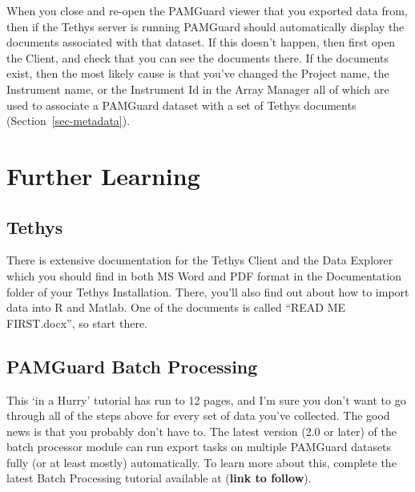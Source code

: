 \documentclass[
]{article}
\begin{document}
When you close and re-open the PAMGuard viewer that you exported data
from, then if the Tethys server is running PAMGuard should automatically
display the documents associated with that dataset. If this doesn't
happen, then first open the Client, and check that you can see the
documents there. If the documents exist, then the most likely cause is
that you've changed the Project name, the Instrument name, or the
Instrument Id in the Array Manager all of which are used to associate a
PAMGuard dataset with a set of Tethys documents
(Section~\ref{sec-metadata}).

\section{Further Learning}\label{further-learning}

\subsection{Tethys}\label{tethys}

There is extensive documentation for the Tethys Client and the Data
Explorer which you should find in both MS Word and PDF format in the
Documentation folder of your Tethys Installation. There, you'll also
find out about how to import data into R and Matlab. One of the
documents is called ``READ ME FIRST.docx'', so start there.

\subsection{PAMGuard Batch Processing}\label{pamguard-batch-processing}

This `in a Hurry' tutorial has run to 12 pages, and I'm sure you don't
want to go through all of the steps above for every set of data you've
collected. The good news is that you probably don't have to. The latest
version (2.0 or later) of the batch processor module can run export
tasks on multiple PAMGuard datasets fully (or at least mostly)
automatically. To learn more about this, complete the latest Batch
Processing tutorial available at (\textbf{link to follow}).
\end{document}
